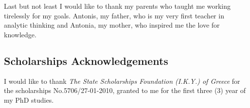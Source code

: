 \documentclass[
    12pt, %
    singlespacing, %
    liststotoc, %
    headsepline, %
]{DoctoralThesis} %
\begin{document}
Last but not least I would like to thank my parents who taught me working tirelessly for my goals. Antonis, my father, who is my very first teacher in analytic thinking and Antonia, my mother, who inspired me the love for knowledge. 

\subsection*{Scholarships Acknowledgements}
I would like to thank \textit{The State Scholarships Foundation (I.K.Y.) of Greece} for the scholarships No.5706/27-01-2010, granted to me for the first three (3) year of my PhD studies.


\newpage



\end{document}
